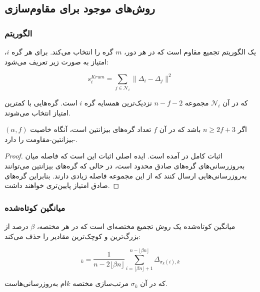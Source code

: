 \subsection{روش‌های موجود برای مقاوم‌سازی}

\subsubsection{الگوریتم }
 \cite{blanchard2017machine} یک الگوریتم تجمیع مقاوم است که در هر دور، $m$ گره را انتخاب می‌کند. برای هر گره $i$، امتیاز  به صورت زیر تعریف می‌شود:

\begin{equation}
    s_i^{Krum} = \sum_{j \in \mathcal{N}_i} \|\Delta_i - \Delta_j\|^2
    \label{eq:krum_score}
\end{equation}

که در آن $\mathcal{N}_i$ مجموعه $n-f-2$ نزدیک‌ترین همسایه گره $i$ است. گره‌هایی با کمترین امتیاز انتخاب می‌شوند.

\begin{nttheorem}
\label{theorem:krum}
اگر $n \geq 2f + 3$ باشد که در آن $f$ تعداد گره‌های بیزانتین است، آنگاه  خاصیت $(\alpha, f)$-بیزانتین-مقاومت را دارد.
\end{nttheorem}

\begin{proof}
    اثبات کامل در \cite{blanchard2017machine} آمده است. ایده اصلی اثبات این است که فاصله میان به‌روزرسانی‌های گره‌های صادق محدود است، در حالی که گره‌های بیزانتین می‌توانند به‌روزرسانی‌هایی ارسال کنند که از این مجموعه فاصله زیادی دارند. بنابراین گره‌های صادق امتیاز  پایین‌تری خواهند داشت.
\end{proof}

\subsubsection{میانگین کوتاه‌شده}
میانگین کوتاه‌شده \cite{yin2018byzantine} یک روش تجمیع مختصه‌ای است که در هر مختصه، $\beta$ درصد از بزرگ‌ترین و کوچک‌ترین مقادیر را حذف می‌کند:

\begin{equation}
    [\text{TrimMean}(\Delta_1, \ldots, \Delta_n)]_k = \frac{1}{n - 2\lfloor\beta n\rfloor} \sum_{i=\lfloor\beta n\rfloor + 1}^{n - \lfloor\beta n\rfloor} \Delta_{\sigma_k(i), k}
    \label{eq:trimmed_mean}
\end{equation}

که در آن $\sigma_k$ مرتب‌سازی مختصه $k$ام به‌روزرسانی‌هاست.


